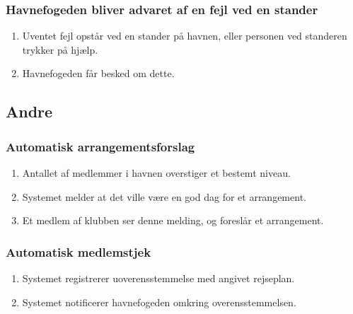     \subsubsection{Havnefogeden bliver advaret af en fejl ved en stander}
    \begin{enumerate}
      \item Uventet fejl opstår ved en stander på havnen, eller personen ved standeren trykker på hjælp.
      \item Havnefogeden får besked om dette.
    \end{enumerate}

\subsection{Andre}

    \subsubsection{Automatisk arrangementsforslag}

    \begin{enumerate}
      \item Antallet af medlemmer i havnen overstiger et bestemt niveau.
      \item Systemet melder at det ville være en god dag for et arrangement.
      \item Et medlem af klubben ser denne melding, og foreslår et arrangement.
    \end{enumerate}

    \subsubsection{Automatisk medlemstjek}

    \begin{enumerate}
      \item Systemet registrerer uoverensstemmelse med angivet rejseplan.
      \item Systemet notificerer havnefogeden omkring overensstemmelsen.
    \end{enumerate}
